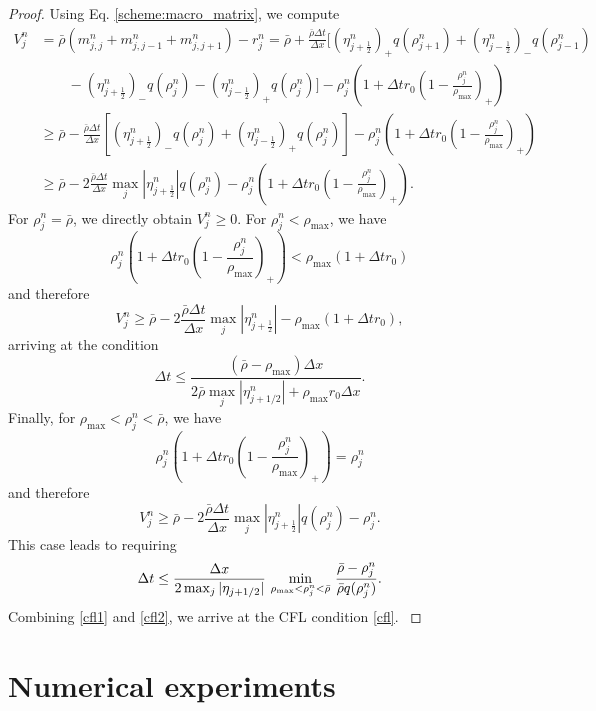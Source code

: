 \documentclass[review,onefignum,onetabnum]{siamart220329}
\begin{document}
\begin{proof}
{Using Eq. \eqref{scheme:macro_matrix}, we compute
\begin{equation*}
\begin{split}
    V^n_j &= \bar{\rho}(m_{j,j}^n + m_{j,j-1}^n + m_{j,j+1}^n) -r_j^n  = \bar{\rho} + \frac{\bar{\rho} \Delta t}{\Delta x} [(\eta_{j+\frac12}^n)_+ q(\rho_{j+1}^n) + (\eta_{j-\frac12}^n)_- q(\rho_{j-1}^n) \\ & \qquad - (\eta_{j+\frac12}^n)_- q(\rho_j^n) - (\eta_{j-\frac12}^n)_+ q(\rho_j^n) ] - \rho_j^n ( 1+ \Delta t r_0 ( 1 - \frac{\rho_j^n}{\rho_{\max}})_+) \\
    & \geq \bar{\rho} - \frac{\bar{\rho} \Delta t}{\Delta x} [ (\eta_{j+\frac12}^n)_- q(\rho_j^n) + (\eta_{j-\frac12}^n)_+ q(\rho_j^n) ] - \rho_j^n ( 1+ \Delta t r_0 ( 1 - \frac{\rho_j^n}{\rho_{\max}})_+)\\
    & \geq \bar{\rho} - 2\frac{\bar{\rho} \Delta t}{\Delta x} \max_j |\eta_{j+\frac12}^n| q(\rho_j^n) - \rho_j^n ( 1+ \Delta t r_0 ( 1 - \frac{\rho_j^n}{\rho_{\max}})_+).
\end{split}
\end{equation*}
\noindent For $\rho_j^n = \bar{\rho}$, we directly obtain $V_j^n \geq 0$. For $\rho_j^n <\rho_{\max}$, we have 
$$
\rho_j^n ( 1+ \Delta t r_0 ( 1 - \frac{\rho_j^n}{\rho_{\max}})_+) < \rho_{\max} (1+ \Delta t r_0)
$$
and therefore
$$
V_j^n \geq \bar{\rho} - 2\frac{\bar{\rho} \Delta t}{\Delta x} \max_j |\eta_{j+\frac12}^n| - \rho_{\max} (1+ \Delta t r_0), 
$$
arriving at the condition 
\begin{equation}\label{cfl1}
\Delta t \leq  \frac{(\bar{\rho} - \rho_{\max})\Delta x}{2 \bar{\rho} \max_j |\eta_{j+1/2}^n| + \rho_{\max} r_0 \Delta x}.
\end{equation}
Finally, for $\rho_{\max} < \rho_j^n < \bar{\rho}$, we have
$$
\rho_j^n ( 1+ \Delta t r_0 ( 1 - \frac{\rho_j^n}{\rho_{\max}})_+) = \rho_j^n 
$$
and therefore
$$
V_j^n \geq \bar{\rho} - 2\frac{\bar{\rho} \Delta t}{\Delta x} \max_j |\eta_{j+\frac12}^n|q(\rho_j^n) - \rho_j^n. 
$$
This case leads to requiring
\begin{equation}\label{cfl2}
{
\Delta t \leq \frac{\Delta x}{2 \max_j |\eta_{j+1/2}|}\ \underset{ \rho_{\max} < \rho_j^n < \bar{\rho}}{\min} \ \frac{\bar{\rho} - \rho_j^n}{\bar{\rho} q(\rho_j^n)}.}
\end{equation}
Combining \eqref{cfl1} and \eqref{cfl2}, we arrive at the CFL condition \eqref{cfl}.
}
\end{proof}


\section{Numerical experiments}\label{numerical results}
\end{document}
